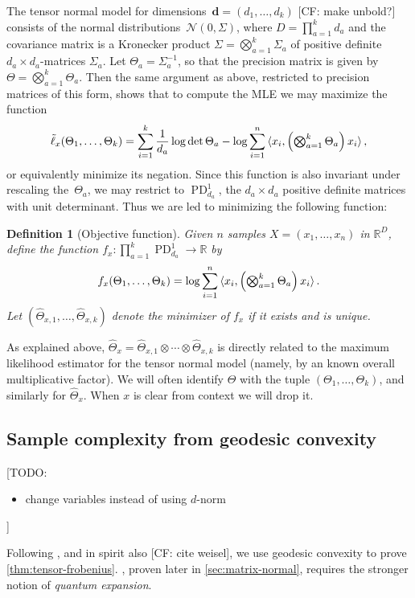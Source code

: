 \documentclass{article}
\newtheorem{definition}{Definition}
\newcommand{\R}{{\mathbb{R}}}
\newcommand{\ot}{\otimes}
\renewcommand{\vec}{\bm}
\newcommand\cN{\mathcal{N}}
\newcommand\PD{\operatorname{PD}}
\newcommand\samp{x}
\newcommand\rv{X}
\newcommand{\CF}[1]{{\color{purple}[CF: #1]}}
\newcommand{\TODO}[1]{{\color{blue}[TODO: #1]}}
\begin{document}
The tensor normal model for dimensions~$\vec d=(d_1,\dots,d_k)$ \CF{make unbold?} consists of the normal distributions~$\cN(0,\Sigma)$, where $D = \prod_{a=1}^k d_a$ and the covariance matrix is a Kronecker product $\Sigma = \bigotimes_{a=1}^k \Sigma_a$ of positive definite $d_a\times d_a$-matrices $\Sigma_a$.
Let $\Theta_a = \Sigma_a^{-1}$, so that the precision matrix is given by $\Theta = \bigotimes_{a=1}^k \Theta_a$.
Then the same argument as above, restricted to precision matrices of this form, shows that to compute the MLE we may maximize the function
\begin{align*}
  \tilde\ell_{\samp}(\Theta_1,\dots,\Theta_k) = \sum_{i=1}^k \frac1{d_a} \log \det \Theta_a - \log \sum_{i=1}^n \braket{\samp_i, \left( \textstyle \bigotimes_{a=1}^k \Theta_a \right) \samp_i},
\end{align*}
or equivalently minimize its negation.
Since this function is also invariant under rescaling the~$\Theta_a$, we may restrict to $\PD_{d_a}^1$, the $d_a\times d_a$ positive definite matrices with unit determinant.
Thus we are led to minimizing the following function:

\begin{definition}[Objective function]\label{dfn:function}
Given $n$ samples $\rv = (\samp_1, \dots, \samp_n)$ in $\R^D$, define the function $f_{\samp}\colon\prod_{a=1}^k \PD_{d_a}^1 \to \R$ by
\begin{align}\label{eq:projective-likelihood}
  f_{\samp}(\Theta_1,\dots,\Theta_k) = \log \sum_{i=1}^n \braket{\samp_i, \left( \textstyle \bigotimes_{a=1}^k \Theta_a \right) \samp_i}.
\end{align}
Let $(\widehat{\Theta}_{\samp,1}, \dots, \widehat{\Theta}_{\samp,k})$ denote the minimizer of $f_{\samp}$ if it exists and is unique.
\end{definition}

\noindent
As explained above, $\widehat{\Theta}_{\samp} = \widehat{\Theta}_{\samp,1} \ot \cdots \ot \widehat{\Theta}_{\samp,k}$ is directly related to the maximum likelihood estimator for the tensor normal model (namely, by an known overall multiplicative factor).
We will often identify $\Theta$ with the tuple $(\Theta_1,\dots,\Theta_k)$, and similarly for $\widehat{\Theta}_{\samp}$.
When $\samp$ is clear from context we will drop it.


\subsection{Sample complexity from geodesic convexity}\label{subsec:outline}
\TODO{
\begin{itemize}
\item change variables instead of using $d$-norm
\end{itemize}}
Following \cite{FM20}, and in spirit also \CF{cite weisel}, we use geodesic convexity to prove \cref{thm:tensor-frobenius}.
, proven later in \cref{sec:matrix-normal}, requires the stronger notion of \emph{quantum expansion}.
\end{document}

